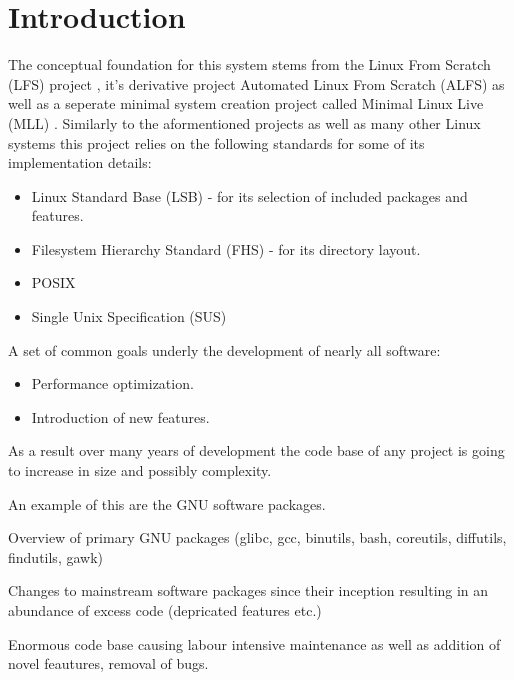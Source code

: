 \section{Introduction}\label{Introduction}

The conceptual foundation for this system stems from the Linux From Scratch (LFS) project \cite{lfs}, it's derivative project Automated Linux From Scratch (ALFS) \cite{alfs} as well as a seperate minimal system creation project called Minimal Linux Live (MLL) \cite{mll}. Similarly to the aformentioned projects as well as many other Linux systems this project relies on the following standards for some of its implementation details:

\begin{itemize}
    \item Linux Standard Base (LSB) \cite{lsb} - for its selection of included packages and features.
    \item Filesystem Hierarchy Standard (FHS) \cite{fhs} - for its directory layout.
    \item POSIX
    \item Single Unix Specification (SUS)
\end{itemize}


A set of common goals underly the development of nearly all software:

\begin{itemize}
    \item Performance optimization.
    \item Introduction of new features.
\end{itemize}

As a result over many years of development the code base of any project is going to increase in size and possibly complexity.

An example of this are the GNU software packages.

Overview of primary GNU packages (glibc, gcc, binutils, bash, coreutils, diffutils, findutils, gawk)

Changes to mainstream software packages since their inception resulting in an abundance of excess code (depricated features etc.)

Enormous code base causing labour intensive maintenance as well as addition of novel feautures, removal of bugs.


